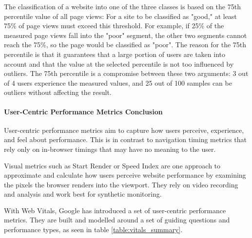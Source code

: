 

The classification of a website into one of the three classes is based on the 75th percentile value of all page views:
For a site to be classified as "good," at least 75\% of page views must exceed this threshold.
For example, if 25\% of the measured page views fall into the "poor" segment, the other two segments cannot reach the 75\%, so the page would be classified as "poor".
The reason for the 75th percentile is that it guarantees that a large portion of users are taken into account and that the value at the selected percentile is not too influenced by outliers.
The 75th percentile is a compromise between these two arguments: 3 out of 4 users experience the measured values, and 25 out of 100 samples can be outliers without affecting the result.



\paragraph{User-Centric Performance Metrics Conclusion} %


User-centric performance metrics aim to capture how users perceive, experience, and feel about performance.
This is in contrast to navigation timing metrics that rely only on in-browser timings that may have no meaning to the user.


Visual metrics such as Start Render or Speed Index are one approach to approximate and calculate how users perceive website performance by examining the pixels the browser renders into the viewport.
They rely on video recording and analysis and work best for synthetic monitoring.


With Web Vitals, Google has introduced a set of user-centric performance metrics.
They are built and modelled around a set of guiding questions and performance types, as seen in table \ref{table:vitals_summary}.

